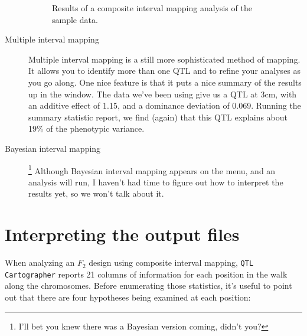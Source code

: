 \documentclass[12pt]{article}
\newcommand{\qtl}{{\tt QTL Cartographer}}
\begin{document}
\begin{description}
\begin{figure}
\begin{center}
\end{center}
\caption{Results of a composite interval mapping analysis of the
  sample data.}\label{fig:qtl-composite-results}
\end{figure}

\item[Multiple interval mapping] Multiple interval mapping is a still
  more sophisticated method of mapping. It allows you to identify more
  than one QTL and to refine your analyses as you go along. One nice
  feature is that it puts a nice summary of the results up in the
  window. The data we've been using give us a QTL at 3cm, with an
  additive effect of 1.15, and a dominance deviation of
  0.069. Running the summary statistic report, we find (again) that
  this QTL explains about 19\% of the phenotypic variance.

\item[Bayesian interval mapping]\footnote{I'll bet you knew there was
  a Bayesian version coming, didn't you?} Although Bayesian interval
  mapping appears on the menu, and an analysis will run, I haven't had
  time to figure out how to interpret the results yet, so we won't
  talk about it.

\end{description}

\section*{Interpreting the output files}

When analyzing an $F_2$ design using composite interval mapping,
\qtl{} reports 21 columns of information for each position in the walk
along the chromosomes. Before enumerating those statistics, it's
useful to point out that there are four hypotheses being examined at
each position:
\end{document}
